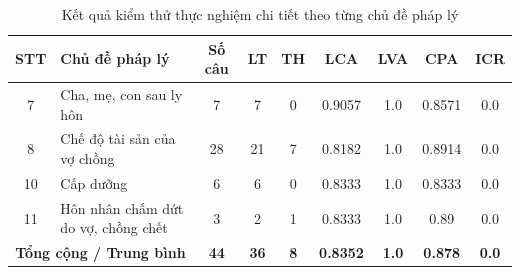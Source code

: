 \documentclass[../DoAn.tex]{subfiles}
\begin{document}
\begin{table}[H]
\centering
\small
\begin{tabular}{|c|p{3cm}|c|c|c|c|c|c|c|}
\hline
\textbf{STT} & \textbf{Chủ đề pháp lý} & \textbf{Số câu} & \textbf{LT} & \textbf{TH} & \textbf{LCA} & \textbf{LVA} & \textbf{CPA} & \textbf{ICR} \\ \hline\hline

7 & Cha, mẹ, con sau ly hôn & 7 & 7 & 0 & 0.9057 & 1.0 & 0.8571 & 0.0 \\ \hline
8 & Chế độ tài sản của vợ chồng & 28 & 21 & 7 & 0.8182 & 1.0 & 0.8914 & 0.0 \\ \hline
10 & Cấp dưỡng & 6 & 6 & 0 & 0.8333 & 1.0 & 0.8333 & 0.0 \\ \hline
11 & Hôn nhân chấm dứt do vợ, chồng chết & 3 & 2 & 1 & 0.8333 & 1.0 & 0.89 & 0.0 \\ \hline

\multicolumn{2}{|c|}{\textbf{Tổng cộng / Trung bình}} & \textbf{44} & \textbf{36} & \textbf{8} & \textbf{0.8352} & \textbf{1.0} & \textbf{0.878} & \textbf{0.0} \\ \hline
\end{tabular}
\caption{Kết quả kiểm thử thực nghiệm chi tiết theo từng chủ đề pháp lý}
\label{table:experimental_results}
\end{table}
\end{document}
